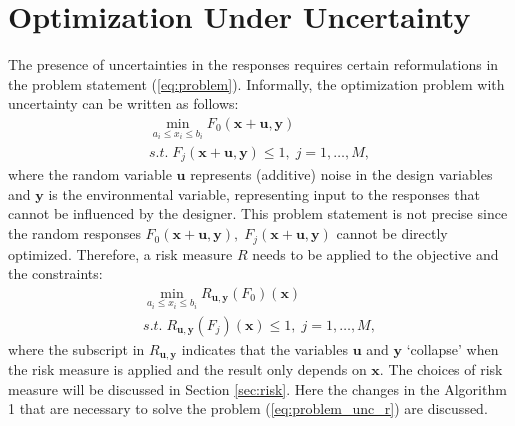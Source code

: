 \documentclass{llncs}
\begin{document}
\section{Optimization Under Uncertainty}

The presence of uncertainties in the responses requires certain reformulations in the problem statement (\ref{eq:problem}). Informally, the optimization problem with uncertainty can be written as follows:
\begin{equation}
  \label{eq:problem_unc}
  \begin{array}{c}
  \min\limits_{a_i \le x_i \le b_i}F_0(\pmb x + \pmb u, \pmb y) \\
  s.t.\; F_j(\pmb x + \pmb u, \pmb y) \le 1,\; j=1,\dots ,M,
  \end{array}
\end{equation}
where the random variable $\pmb u$ represents (additive) noise in the design variables and $\pmb y$ is the environmental variable, representing input to the responses that cannot be influenced by the designer. This problem statement is not precise since the random responses $F_0 (\pmb x+\pmb u,\pmb y),\; F_j (\pmb x+\pmb u,\pmb y)$ cannot be directly optimized. Therefore, a risk measure $R$ needs to be applied to the objective and the constraints:
\begin{equation}
  \label{eq:problem_unc_r}
  \begin{array}{c}
  \min\limits_{a_i \le x_i \le b_i}R_{\pmb u,\pmb y}(F_0)(\pmb x) \\
  s.t.\; R_{\pmb u,\pmb y}(F_j)(\pmb x) \le 1,\; j=1,\dots ,M,
  \end{array}
\end{equation}
where the subscript in $R_{\pmb u,\pmb y}$ indicates that the variables $\pmb u$ and $\pmb y$ ‘collapse’ when the risk measure is applied and the result only depends on $\pmb x$. The choices of risk measure will be discussed in Section \ref{sec:risk}. Here the changes in the Algorithm 1 that are necessary to solve the problem (\ref{eq:problem_unc_r}) are discussed.
\end{document}
